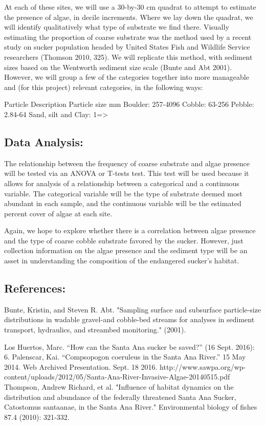 \documentclass{article}\usepackage[]{graphicx}\usepackage[]{color}
\begin{document}
At each of these sites, we will use a 30-by-30 cm quadrat to attempt to estimate the presence of algae, in decile increments. Where we lay down the quadrat, we will identify qualitatively what type of substrate we find there. Visually estimating the proportion of coarse substrate was the method used by a recent study on sucker population headed by United States Fish and Wildlife Service researchers (Thomson 2010, 325). We will replicate this method, with sediment sizes based on the Wentworth sediment size scale (Bunte and Abt 2001). However, we will group a few of the categories together into more manageable and (for this project) relevant categories, in the following ways:

 Particle Description   	Particle size mm 
  Boulder: 		257-4096
  Cobble:   		63-256
  Pebble:		2.84-64
  Sand, silt and Clay:   1=>

\subsection{Data Analysis:}

The relationship between the frequency of coarse substrate and algae presence will be tested via an ANOVA or T-tests test. This test will be used because it allows for analysis of a relationship between a categorical and a continuous variable. The categorical variable will be the type of substrate deemed most abundant in each sample, and the continuous variable will be the estimated percent cover of algae at each site.

Again, we hope to explore whether there is a correlation between algae presence and the type of coarse cobble substrate favored by the sucker. However, just collection information on the algae presence and the sediment type will be an asset in understanding the composition of the endangered sucker’s habitat.

\subsection{References:}

Bunte, Kristin, and Steven R. Abt. "Sampling surface and subsurface particle-size distributions in wadable gravel-and cobble-bed streams for analyses in sediment transport, hydraulics, and streambed monitoring." (2001).

Los Huertos, Marc. “How can the Santa Ana sucker be saved?” (16 Sept. 2016): 6.
Palenscar, Kai. “Compsopogon coeruleus in the Santa Ana River.” 15 May 2014. Web Archived Presentation. Sept. 18 2016.
http://www.sawpa.org/wp-content/uploads/2012/05/Santa-Ana-River-Invasive-Algae-20140515.pdf
Thompson, Andrew Richard, et al. "Influence of habitat dynamics on the distribution and abundance of the federally threatened Santa Ana Sucker, Catostomus santaanae, in the Santa Ana River." Environmental biology of fishes 87.4 (2010): 321-332.
\end{document}
